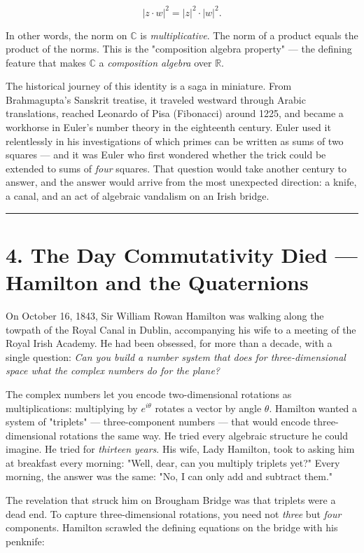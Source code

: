 \documentclass[12pt, letterpaper, openany]{book}
\theoremstyle{definition}
\theoremstyle{remark}
\begin{document}
\[
|z \cdot w|^2 = |z|^2 \cdot |w|^2.
\]

In other words, the norm on $\mathbb{C}$ is \textit{multiplicative}. The norm of a product equals the product of the norms. This is the "composition algebra property" --- the defining feature that makes $\mathbb{C}$ a \textit{composition algebra} over $\mathbb{R}$.

The historical journey of this identity is a saga in miniature. From Brahmagupta's Sanskrit treatise, it traveled westward through Arabic translations, reached Leonardo of Pisa (Fibonacci) around 1225, and became a workhorse in Euler's number theory in the eighteenth century. Euler used it relentlessly in his investigations of which primes can be written as sums of two squares --- and it was Euler who first wondered whether the trick could be extended to sums of \textit{four} squares. That question would take another century to answer, and the answer would arrive from the most unexpected direction: a knife, a canal, and an act of algebraic vandalism on an Irish bridge.


\bigskip\noindent\rule{\textwidth}{0.4pt}\bigskip



\section*{4. The Day Commutativity Died --- Hamilton and the Quaternions}


On October 16, 1843, Sir William Rowan Hamilton was walking along the towpath of the Royal Canal in Dublin, accompanying his wife to a meeting of the Royal Irish Academy. He had been obsessed, for more than a decade, with a single question: \textit{Can you build a number system that does for three-dimensional space what the complex numbers do for the plane?}

The complex numbers let you encode two-dimensional rotations as multiplications: multiplying by $e^{i\theta}$ rotates a vector by angle $\theta$. Hamilton wanted a system of "triplets" --- three-component numbers --- that would encode three-dimensional rotations the same way. He tried every algebraic structure he could imagine. He tried for \textit{thirteen years}. His wife, Lady Hamilton, took to asking him at breakfast every morning: "Well, dear, can you multiply triplets yet?" Every morning, the answer was the same: "No, I can only add and subtract them."

The revelation that struck him on Brougham Bridge was that triplets were a dead end. To capture three-dimensional rotations, you need not \textit{three} but \textit{four} components. Hamilton scrawled the defining equations on the bridge with his penknife:
\end{document}
